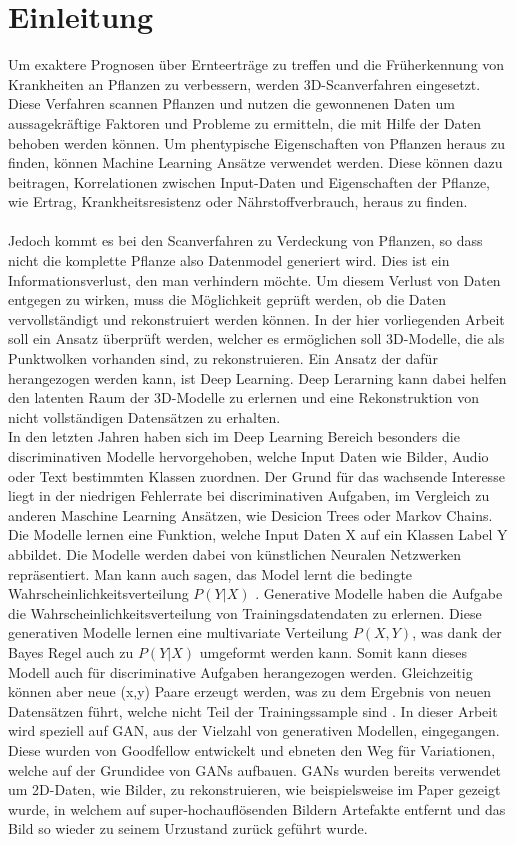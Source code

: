 \documentclass{llncs}
\begin{document}
\section{Einleitung}%
Um exaktere Prognosen über Ernteerträge zu treffen und die Früherkennung von Krankheiten an Pflanzen zu verbessern, werden 3D-Scanverfahren eingesetzt. Diese Verfahren scannen Pflanzen und nutzen die gewonnenen Daten um aussagekräftige Faktoren und Probleme zu ermitteln, die mit Hilfe der Daten behoben werden können. Um phentypische Eigenschaften von Pflanzen heraus zu finden, können Machine Learning Ansätze verwendet werden. Diese können dazu beitragen, Korrelationen zwischen Input-Daten und Eigenschaften der Pflanze, wie Ertrag, Krankheitsresistenz oder Nährstoffverbrauch, heraus zu finden. 
\\\\
Jedoch kommt es bei den Scanverfahren zu Verdeckung von Pflanzen, so dass nicht die komplette Pflanze also Datenmodel generiert wird. Dies ist ein Informationsverlust, den man verhindern möchte. Um diesem Verlust von Daten entgegen zu wirken, muss die Möglichkeit geprüft werden, ob die Daten vervollständigt und rekonstruiert werden können. In der hier vorliegenden Arbeit soll ein Ansatz überprüft werden, welcher es ermöglichen soll 3D-Modelle, die als Punktwolken vorhanden sind, zu rekonstruieren. Ein Ansatz der dafür herangezogen werden kann, ist Deep Learning. Deep Lerarning kann dabei helfen den latenten Raum der 3D-Modelle zu erlernen und eine Rekonstruktion von nicht vollständigen Datensätzen zu erhalten. 
\\
In den letzten Jahren haben sich im Deep Learning Bereich besonders die discriminativen Modelle hervorgehoben, welche Input Daten wie Bilder, Audio oder Text bestimmten Klassen zuordnen. Der Grund für das wachsende Interesse liegt in der niedrigen Fehlerrate bei discriminativen Aufgaben, im Vergleich zu anderen Maschine Learning Ansätzen, wie Desicion Trees oder Markov Chains\cite{Grundlagen}. Die Modelle lernen eine Funktion, welche Input Daten X auf ein Klassen Label Y abbildet. Die Modelle werden dabei von künstlichen Neuralen Netzwerken repräsentiert. Man kann auch sagen, das Model lernt die bedingte Wahrscheinlichkeitsverteilung $P(Y|X)$ \cite{discrim}. Generative Modelle haben die Aufgabe die Wahrscheinlichkeitsverteilung von Trainingsdatendaten zu erlernen. Diese generativen Modelle lernen eine multivariate Verteilung $P(X,Y)$, was dank der Bayes Regel auch zu $P(Y|X)$ umgeformt werden kann. Somit kann dieses Modell auch für discriminative Aufgaben herangezogen werden. Gleichzeitig können aber neue (x,y) Paare erzeugt werden, was zu dem Ergebnis von neuen Datensätzen führt, welche nicht Teil der Trainingssample sind \cite{discrim}. In dieser Arbeit wird speziell auf GAN, aus der Vielzahl von generativen Modellen, eingegangen. Diese wurden von Goodfellow\cite{goodfellow2014} entwickelt und ebneten den Weg für Variationen, welche auf der Grundidee von GANs aufbauen. GANs wurden bereits verwendet um 2D-Daten, wie Bilder, zu rekonstruieren, wie beispielsweise im Paper \cite{imagere1} gezeigt wurde, in welchem auf super-hochauflösenden Bildern Artefakte entfernt und das Bild so wieder zu seinem Urzustand zurück geführt wurde.
\end{document}
